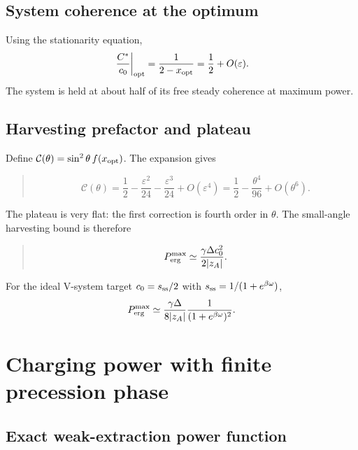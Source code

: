 \documentclass[11pt,a4paper]{article}
\newcommand{\eps}{\varepsilon}
\newenvironment{resultbox}{\begin{quote}\small\color{blue!40!black}}{\end{quote}}
\begin{document}
\subsection{System coherence at the optimum}

Using the stationarity equation,
\begin{equation}
\left.\frac{C^*}{c_0}\right|_{\rm opt}=\frac{1}{2-x_{\rm opt}}=\frac12+O(\eps).
\end{equation}
The system is held at about half of its free steady coherence at maximum power.

\subsection{Harvesting prefactor and plateau}

Define $\mathcal C(\theta)=\sin^2\theta\,f(x_{\rm opt})$. The expansion gives
\begin{resultbox}
\begin{equation}
\mathcal C(\theta)=\frac12-\frac{\eps^2}{24}-\frac{\eps^3}{24}+O(\eps^4)
=\frac12-\frac{\theta^4}{96}+O(\theta^6).
\end{equation}
\end{resultbox}
The plateau is very flat: the first correction is fourth order in $\theta$. The small-angle harvesting bound is therefore
\begin{resultbox}
\begin{equation}
P_{\rm erg}^{\rm max}\simeq \frac{\gamma\Delta c_0^2}{2|z_A|}.
\end{equation}
\end{resultbox}
For the ideal V-system target $c_0=s_{\rm ss}/2$ with $s_{\rm ss}=1/(1+e^{\beta\omega})$,
\begin{equation}
P_{\rm erg}^{\rm max}\simeq \frac{\gamma\Delta}{8|z_A|}\frac{1}{(1+e^{\beta\omega})^2}.
\end{equation}

\section{Charging power with finite precession phase}\label{sec:powerphi}

\subsection{Exact weak-extraction power function}
\end{document}

